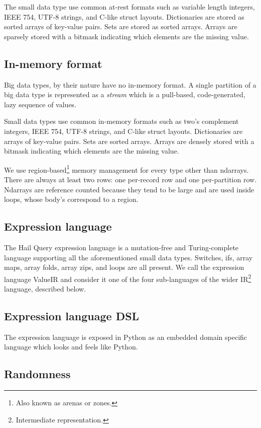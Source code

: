 \documentclass[10pt,a4paper%
]{article}
\begin{document}
The small data type use common at-rest formats such as variable length integers, IEEE 754, UTF-8
strings, and C-like struct layouts. Dictionaries are stored as sorted arrays of key-value
pairs. Sets are stored as sorted arrays. Arrays are sparsely stored with a bitmask indicating which
elements are the missing value.

\subsection{In-memory format}

Big data types, by their nature have no in-memory format. A single partition of a big data type is
represented as a \emph{stream} which is a pull-based, code-generated, lazy sequence of values.

Small data types use common in-memory formats such as two's complement integers, IEEE 754, UTF-8
strings, and C-like struct layouts. Dictionaries are arrays of key-value pairs. Sets are sorted
arrays. Arrays are densely stored with a bitmask indicating which elements are the missing value.

We use region-based\footnote{Also known as arenas or zones.} memory management for every type other
than ndarrays. There are always at least two rows: one per-record row and one per-partition
row. Ndarrays are reference counted because they tend to be large and are used inside loops, whose
body's correspond to a region.

\subsection{Expression language}

The Hail Query expression language is a mutation-free and Turing-complete language supporting all
the aforementioned small data types. Switches, ifs, array maps, array folds, array zips, and loops
are all present. We call the expression language ValueIR and consider it one of the four
sub-languages of the wider IR\footnote{Intermediate representation.} language, described below.

\subsection{Expression language DSL}

The expression language is exposed in Python as an embedded domain specific language which looks and
feels like Python.

\subsection{Randomness}
\end{document}
